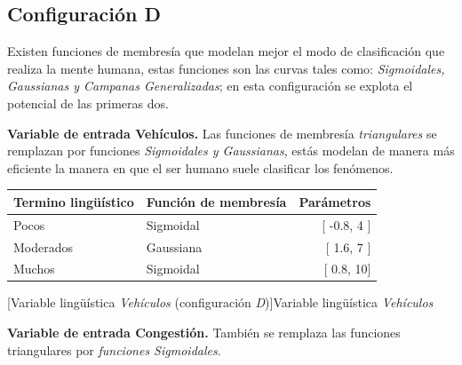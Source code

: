 \subsection{Configuración D}\label{section:configd}
Existen funciones de membresía que modelan mejor el modo de clasificación que realiza la mente humana, estas funciones son las curvas tales como: \textit{Sigmoidales, Gaussianas y Campanas Generalizadas}; en esta configuración se explota el potencial de las primeras dos.

\textbf{Variable de entrada Vehículos.} Las funciones de membresía \textit{triangulares} se remplazan por funciones \textit{Sigmoidales y Gaussianas}, estás modelan de manera más eficiente la manera en que el ser humano suele clasificar los fenómenos.
\begin{center}
	\begin{tabular}{llr} \toprule
		Termino lingüístico & Función de membresía & Parámetros \\ \midrule
		Pocos & Sigmoidal & [ -0.8, 4 ] \\
		Moderados & Gaussiana & [ 1.6, 7 ] \\
		Muchos & Sigmoidal & [ 0.8, 10] \\ \bottomrule
	\end{tabular}
	[Variable lingüística \textit{Vehículos} (configuración \textit{D})]{Variable lingüística \textit{Vehículos}}
\end{center}

\textbf{Variable de entrada Congestión.} También se remplaza las funciones triangulares por \textit{funciones Sigmoidales}.

